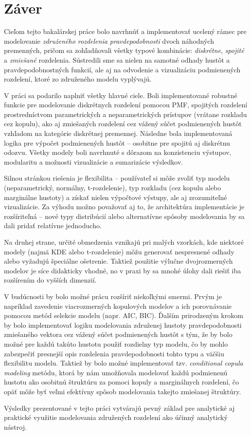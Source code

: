 \chapter{Záver}

Cieľom tejto bakalárskej práce bolo navrhnúť a implementovať ucelený rámec pre modelovanie \textit{združeného rozdelenia pravdepodobnosti} dvoch náhodných premenných, pričom sa zohľadňovali všetky typové kombinácie: \textit{diskrétne}, \textit{spojité} a \textit{zmiešané} rozdelenia. Sústredili sme sa nielen na samotné odhady hustôt a pravdepodobnostných funkcií, ale aj na odvodenie a vizualizáciu podmienených rozdelení, ktoré zo združeného modelu vyplývajú.

V práci sa podarilo naplniť všetky hlavné ciele. Boli implementované robustné funkcie pre modelovanie diskrétnych rozdelení pomocou PMF, spojitých rozdelení prostredníctvom parametrických a neparametrických prístupov (vrátane rozkladu cez kopulu), ako aj zmiešaných rozdelení cez vážený súčet podmienených hustôt vzhľadom na kategórie diskrétnej premennej. Následne bola implementovaná logika pre výpočet podmienených hustôt – osobitne pre spojitú aj diskrétnu odozvu. Všetky modely boli navrhnuté s dôrazom na konzistenciu výstupov, modularitu a možnosti vizualizácie a sumarizácie výsledkov.

Silnou stránkou riešenia je flexibilita – používateľ si môže zvoliť typ modelu (neparametrický, normálny, t-rozdelenie), typ rozkladu (cez kopulu alebo marginálne hustoty) a získať nielen výpočtové výstupy, ale aj zrozumiteľné vizualizácie. Za výhodu možno považovať aj to, že architektúra implementácie je rozšíriteľná – nové typy distribúcií alebo alternatívne spôsoby modelovania by sa dali pridať relatívne jednoducho.

Na druhej strane, určité obmedzenia vznikajú pri malých vzorkách, kde niektoré modely (najmä KDE alebo t-rozdelenie) môžu generovať nespresnené odhady alebo vyžadujú špeciálne ošetrenie. Taktiež použitie výlučne dvojrozmerných modelov je síce didakticky vhodné, no v praxi by sa mnohé úlohy dali riešiť iba rozšírením do vyšších dimenzií.

V budúcnosti by bolo možné prácu rozšíriť niekoľkými smermi. Prvým je napríklad zavedenie viacrozmerných kopulových modelov a ich porovnávanie pomocou metód selekcie modelu (napr. AIC, BIC). Ďalším prirodzeným krokom by bolo implementovať logiku modelovania združenej hustoty pravdepodobnosti zmiešaného vektora cez vážený súčet podmienených hustôt s tým, že by bolo možné pre každú takúto hustotu použiť rozdielny typ modelu, čo by mohlo zabezpečiť presnejší opis rozdelenia pravdepodobnosti tohto typu a väčšiu flexibilitu modelu. Taktiež by bolo možné implementovať tzv. \textit{conditional copula modeling} metódu, ktorá by nám umožňovala modelovať každú podmienenú hustotu ako osobitnú štruktúru za pomoci kopuly a marginálnych rozdelení, čo opäť môže byť veľmi efektívny spôsob modelovania takejto zmiešanej štruktúry.

Výsledky prezentované v tejto práci vytvárajú pevný základ pre analytické aj praktické využitie modelovania združených rozdelení ako účinný analytický nástroj.